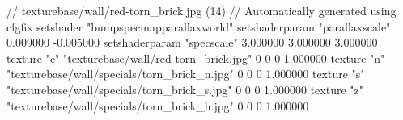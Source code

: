 // texturebase/wall/red-torn_brick.jpg (14)
// Automatically generated using cfgfix
setshader "bumpspecmapparallaxworld"
setshaderparam "parallaxscale" 0.009000 -0.005000
setshaderparam "specscale" 3.000000 3.000000 3.000000
texture "c" "texturebase/wall/red-torn_brick.jpg" 0 0 0 1.000000
texture "n" "texturebase/wall/specials/torn_brick_n.jpg" 0 0 0 1.000000
texture "s" "texturebase/wall/specials/torn_brick_s.jpg" 0 0 0 1.000000
texture "z" "texturebase/wall/specials/torn_brick_h.jpg" 0 0 0 1.000000
